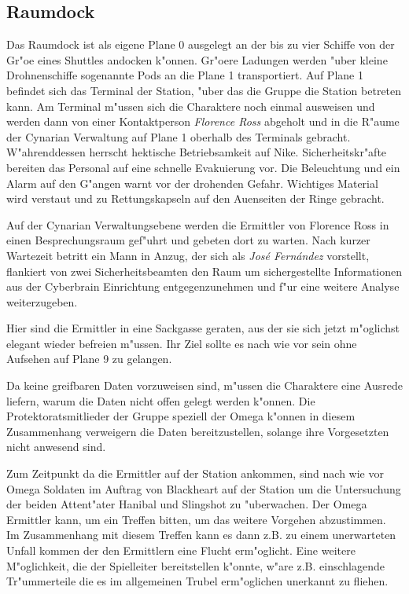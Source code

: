 \subsection{Raumdock}
Das Raumdock ist als eigene Plane 0 ausgelegt an der bis zu vier Schiffe von der Gr"o\3e eines Shuttles andocken k"onnen. Gr"o\3ere Ladungen werden "uber kleine Drohnenschiffe sogenannte Pods an die Plane 1 transportiert. Auf Plane 1 befindet sich das Terminal der Station, "uber das die Gruppe die Station betreten kann. Am Terminal m"ussen sich die Charaktere noch einmal ausweisen und werden dann von einer Kontaktperson \emph{Florence Ross} abgeholt und in die R"aume der Cynarian Verwaltung auf Plane 1 oberhalb des Terminals gebracht. W"ahrenddessen herrscht hektische Betriebsamkeit auf Nike. Sicherheitskr"afte bereiten das Personal auf eine schnelle Evakuierung vor. Die Beleuchtung und ein Alarm auf den G"angen warnt vor der drohenden Gefahr. Wichtiges Material wird verstaut und zu Rettungskapseln auf den Au\3enseiten der Ringe gebracht.

Auf der Cynarian Verwaltungsebene werden die Ermittler von Florence Ross in einen Besprechungsraum gef"uhrt und gebeten dort zu warten. Nach kurzer Wartezeit betritt ein Mann in Anzug, der sich als \emph{Jos\'e Fern\'andez} vorstellt, flankiert von zwei Sicherheitsbeamten den Raum um sichergestellte Informationen aus der Cyberbrain Einrichtung entgegenzunehmen und f"ur eine weitere Analyse weiterzugeben. 

\begin{remarks}
	Hier sind die Ermittler in eine Sackgasse geraten, aus der sie sich jetzt m"oglichst elegant wieder befreien m"ussen. Ihr Ziel sollte es nach wie vor sein ohne Aufsehen auf Plane 9 zu gelangen. 

	Da keine greifbaren Daten vorzuweisen sind, m"ussen die Charaktere eine Ausrede liefern, warum die Daten nicht offen gelegt werden k"onnen. Die Protektoratsmitlieder der Gruppe speziell der Omega k"onnen in diesem Zusammenhang verweigern die Daten bereitzustellen, solange ihre Vorgesetzten nicht anwesend sind.

	Zum Zeitpunkt da die Ermittler auf der Station ankommen, sind nach wie vor Omega Soldaten im Auftrag von Blackheart auf der Station um die Untersuchung der beiden Attent"ater Hanibal und Slingshot zu "uberwachen. Der Omega Ermittler kann, um ein Treffen bitten, um das weitere Vorgehen abzustimmen. Im Zusammenhang mit diesem Treffen kann es dann z.B. zu einem unerwarteten Unfall kommen der den Ermittlern eine Flucht erm"oglicht. Eine weitere M"oglichkeit, die der Spielleiter bereitstellen k"onnte, w"are z.B. einschlagende Tr"ummerteile die es im allgemeinen Trubel erm"oglichen unerkannt zu fliehen.
\end{remarks}
